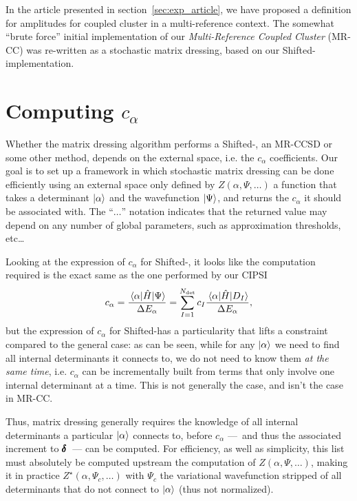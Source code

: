 \documentclass[./thesis.tex]{subfiles}
\begin{document}
In the article presented in section~\ref{sec:exp_article}, we have proposed a definition for amplitudes for coupled cluster in a multi-reference context. The somewhat ``brute force'' initial implementation of our \emph{Multi-Reference Coupled Cluster} (MR-CC) was re-written as a stochastic matrix dressing, based on our Shifted-\Bk implementation.

\section{Computing $c_\alpha$}
Whether the matrix dressing algorithm performs a Shifted-\Bk, an MR-CCSD or some other method, depends on the external space, i.e. the $c_\alpha$ coefficients. Our goal is to set up a framework in which stochastic matrix dressing can be done efficiently using an external space only defined by $Z(\alpha, \Psi, \ldots)$ a function that takes a determinant ${\ket{\alpha}}$ and the wavefunction $\ket \Psi$, and returns the $c_\alpha$ it should be associated with. The ``$\ldots$'' notation indicates that the returned value may depend on any number of global parameters, such as approximation thresholds, etc\dots

Looking at the expression of $c_\alpha$ for Shifted-\Bk, it looks like the computation required is the exact same as the one performed by our CIPSI
\begin{equation}
c_\alpha = \frac{\mel{\alpha}{\hat{H}}{\Psi}}{\Delta E_\alpha} = \sum_{I=1}^{{N_\text{det}}} c_I \frac{\mel{\alpha}{\hat{H}}{D_I}}{\Delta E_\alpha},
\end{equation}
but the expression of $c_\alpha$ for Shifted-\Bk has a particularity that lifts a constraint compared to the general case: as can be seen, while for any ${\ket{\alpha}}$ we need to find all internal determinants it connects to, we do not need to know them \emph{at the same time}, i.e. $c_\alpha$ can be incrementally built from terms that only involve one internal determinant at a time. This is not generally the case, and isn't the case in MR-CC.

Thus, matrix dressing generally requires the knowledge of all internal determinants a particular ${\ket{\alpha}}$ connects to, before $c_\alpha$ ---~and thus the associated increment to $\pmb \delta$~--- can be computed. For efficiency, as well as simplicity, this list must absolutely be computed upstream the computation of $Z(\alpha, \Psi, \ldots)$, making it in practice $Z^\star(\alpha, \Psi_{c}, \ldots)$ with $\Psi_{c}$ the variational wavefunction stripped of all determinants that do not connect to ${\ket{\alpha}}$ (thus not normalized). 
\end{document}
